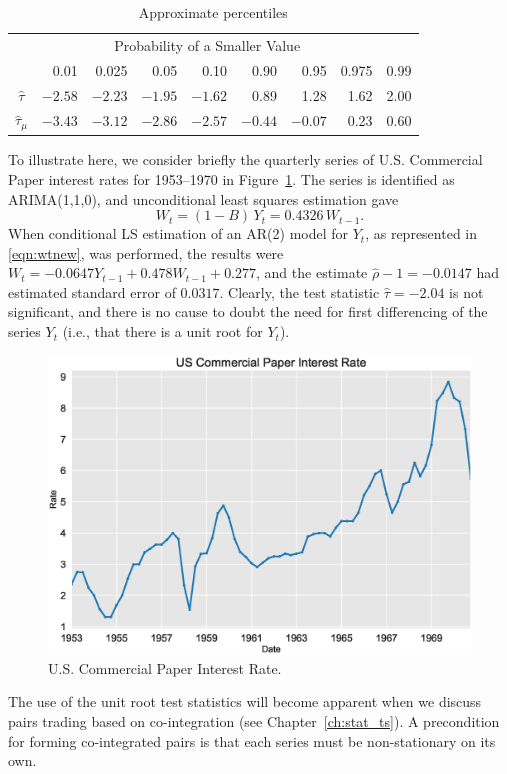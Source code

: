 	\begin{table}[!ht]
	\centering
	\caption{Approximate percentiles \label{tab:percentiles}}
	\begin{tabular}{crrrrrrrr}
	& \multicolumn{7}{c}{Probability of a Smaller Value} \\
	& 0.01 & 0.025 & 0.05 & 0.10 & 0.90 & 0.95 & 0.975 & 0.99 \\ \hline
	$\hat{\tau}$ & $-2.58$ & $-2.23$ & $-1.95$ & $-1.62$  &0.89 & 1.28 & 1.62 & 2.00 \\
	$\hat{\tau}_\mu$ & $-3.43$ & $-3.12$ & $-2.86$ & $-2.57$ & $-0.44$ & $-0.07$ & 0.23 & 0.60
	\end{tabular}
	\end{table}


\begin{ex} 
To illustrate here, we consider briefly the quarterly series of U.S. Commercial Paper interest rates for 1953--1970 in Figure~\ref{fig:exchratefirst}. The series is identified as ARIMA(1,1,0), and unconditional least squares estimation gave 
	\[
	W_t = (1 - B)\, Y_t = 0.4326\, W_{t-1}.
	\]
When conditional LS estimation of an AR(2) model for $Y_t$, as represented in \eqref{eqn:wtnew}, was performed, the results were $W_t = -0.0647Y_{t-1} + 0.478 W_{t-1} + 0.277$, and the estimate $\hat{\rho} - 1 = -0.0147$ had estimated standard error of $0.0317$. Clearly, the test statistic $\hat{\tau} = -2.04$ is not significant, and there is no cause to doubt the need for first differencing of the series $Y_t$ (i.e., that there is a unit root for $Y_t$).
	\begin{figure}[!ht]
	\centering
	\includegraphics[width=\textwidth]{chapters/chapter_uvts/figures/uscompaper.eps}
	\caption{U.S. Commercial Paper Interest Rate. \label{fig:exchratefirst}}
	\end{figure}
The use of the unit root test statistics will become apparent when we discuss pairs trading based on co-integration (see Chapter~\ref{ch:stat_ts}). A precondition for forming co-integrated pairs is that each series must be non-stationary on its own. \xqed
\end{ex}



